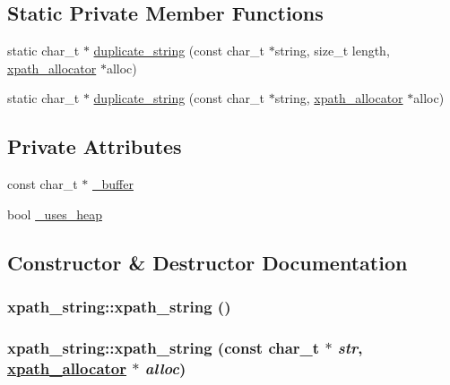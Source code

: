 \subsection*{Static Private Member Functions}
\begin{CompactItemize}
\item 
static char\_\-t $\ast$ \hyperlink{classxpath__string_57c53a0b67fecb1845c31215d8ee206b}{duplicate\_\-string} (const char\_\-t $\ast$string, size\_\-t length, \hyperlink{classxpath__allocator}{xpath\_\-allocator} $\ast$alloc)
\item 
static char\_\-t $\ast$ \hyperlink{classxpath__string_8e1458ed23ff94c0c27f8eb96fb26b11}{duplicate\_\-string} (const char\_\-t $\ast$string, \hyperlink{classxpath__allocator}{xpath\_\-allocator} $\ast$alloc)
\end{CompactItemize}
\subsection*{Private Attributes}
\begin{CompactItemize}
\item 
const char\_\-t $\ast$ \hyperlink{classxpath__string_d52a80412797ca64bbd1bff527e9d666}{\_\-buffer}
\item 
bool \hyperlink{classxpath__string_67a86f6d1a9cf20b922fc9fb1268d4c1}{\_\-uses\_\-heap}
\end{CompactItemize}


\subsection{Constructor \& Destructor Documentation}
\hypertarget{classxpath__string_6c415f55011c6b816446d7454d1e9d2c}{
\subsubsection[xpath\_\-string]{\setlength{\rightskip}{0pt plus 5cm}xpath\_\-string::xpath\_\-string ()}}
\label{classxpath__string_6c415f55011c6b816446d7454d1e9d2c}


\hypertarget{classxpath__string_ac8b63876bb7f9ad6f709e8b2c823557}{
\subsubsection[xpath\_\-string]{\setlength{\rightskip}{0pt plus 5cm}xpath\_\-string::xpath\_\-string (const char\_\-t $\ast$ {\em str}, \hyperlink{classxpath__allocator}{xpath\_\-allocator} $\ast$ {\em alloc})}}
\label{classxpath__string_ac8b63876bb7f9ad6f709e8b2c823557}


